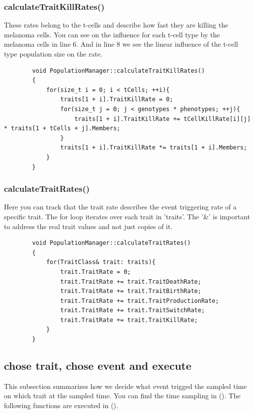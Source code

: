 \documentclass[a4paper,10pt]{scrartcl}
\begin{document}
		\subsubsection{calculateTraitKillRates()}
		These rates belong to the t-cells and describe how fast they are killing the melanoma cells. You can see on the influence for each t-cell type by the melanoma cells in line 6. And in line 8 we see the linear influence of the t-cell type population size on the rate.
		\begin{lstlisting}
		void PopulationManager::calculateTraitKillRates()
		{
		    for(size_t i = 0; i < tCells; ++i){
		        traits[1 + i].TraitKillRate = 0;
		        for(size_t j = 0; j < genotypes * phenotypes; ++j){
		            traits[1 + i].TraitKillRate += tCellKillRate[i][j] * traits[1 + tCells + j].Members;
		        }
		        traits[1 + i].TraitKillRate *= traits[1 + i].Members;
		    }
		}
		\end{lstlisting}

		\subsubsection{calculateTraitRates()}
		Here you can track that the trait rate describes the event triggering rate of a specific trait. The for loop iterates over each trait in 'traits'. The '\&' is important to address the real trait values and not just copies of it.
		\begin{lstlisting} 
		void PopulationManager::calculateTraitRates()
		{
		    for(TraitClass& trait: traits){
		        trait.TraitRate = 0;
		        trait.TraitRate += trait.TraitDeathRate;
		        trait.TraitRate += trait.TraitBirthRate;
		        trait.TraitRate += trait.TraitProductionRate;
		        trait.TraitRate += trait.TraitSwitchRate;
		        trait.TraitRate += trait.TraitKillRate;
		    }
		}
		\end{lstlisting}
		
	\subsection{chose trait, chose event and execute}
	This subsection summarizes how we decide what event trigged the sampled time on which trait at the sampled time. You can find the time sampling in (). The following functions are executed in ().
		
\end{document}
